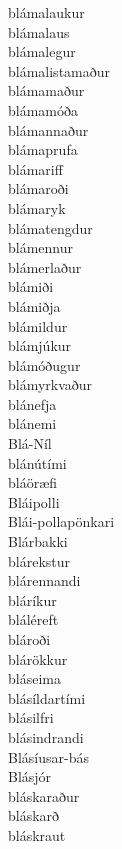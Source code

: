 \documentclass[../samsetningasafn.tex]{subfiles}
\begin{document}
\begin{bigwordlist}
\begin{footnotesize}
\begin{multicols}{4}
\begin{description}
		\item [blámalaukur]
		\item [blámalaus]
		\item [blámalegur]
		\item [blámalistamaður]
		\item [blámamaður]
		\item [blámamóða]
		\item [blámannaður]
		\item [blámaprufa]
		\item [blámariff]
		\item [blámaroði]
		\item [blámaryk]
		\item [blámatengdur]
		\item [blámennur]
		\item [blámerlaður]
		\item [blámiði]
		\item [blámiðja]
		\item [blámildur]
		\item [blámjúkur]
		\item [blámóðugur]
		\item [blámyrkvaður]
		\item [blánefja]
		\item [blánemi]
		\item [Blá-Níl]
		\item [blánútími]
		\item [bláöræfi]
		\item [Bláipolli]
		\item [Blái-pollapönkari]
		\item [Blárbakki]
		\item [blárekstur]
		\item [blárennandi]
		\item [bláríkur]
		\item [bláléreft]
		\item [blároði]
		\item [blárökkur]
		\item [bláseima]
		\item [blásíldartími]
		\item [blásilfri]
		\item [blásindrandi]
		\item [Blásíusar-bás]
		\item [Blásjór]
		\item [bláskaraður]
		\item [bláskarð]
		\item [bláskraut]

\end{description}
\end{multicols}
\end{footnotesize}
\end{bigwordlist}
\end{document}
